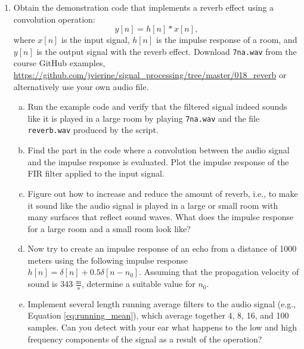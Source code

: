 \begin{enumerate}
  \item Obtain the demonstration code that implements a reverb effect
    using a convolution operation:
    \begin{equation}
      y[n]=h[n]*x[n],
      \end{equation}
    where $x[n]$ is the input signal, $h[n]$ is the impulse response
    of a room, and $y[n]$ is the output signal with the reverb
    effect. Download \verb|7na.wav| from the course GitHub examples,
    \url{https://github.com/jvierine/signal_processing/tree/master/018_reverb}
    or alternatively use your own audio file.

\begin{enumerate}[a)]

\item Run the example code and verify that the filtered signal indeed sounds like it
is played in a large room by playing \verb|7na.wav| and the file \verb|reverb.wav|
produced by the script.

\item Find the part in the code where a convolution between the audio
  signal and the impulse response is evaluated. Plot the impulse
  response of the FIR filter applied to the input signal.

\item Figure out how to increase and reduce the amount of reverb, i.e.,
to make it sound like the audio signal is played in a large or small
room with many surfaces that reflect sound waves. What does the
impulse response for a large room and a small room look like?

\item Now try to create an impulse response of an echo from a distance
  of 1000 meters using the following impulse response
  $h[n]=\delta[n]+0.5\delta[n-n_0]$. Assuming that the propagation velocity of
  sound is 343 $\frac{\mathrm{m}}{\mathrm{s}}$, determine a suitable value for $n_0$.

\item Implement several length running average filters to
  the audio signal (e.g., Equation \ref{eq:running_mean}), which
  average together 4, 8, 16, and 100 samples. Can you detect
  with your ear what happens to the low and high frequency components
  of the signal as a result of the operation?
\end{enumerate}


\end{enumerate}